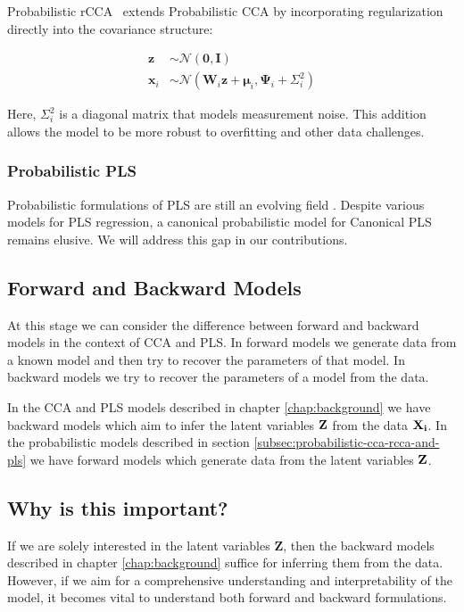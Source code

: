 Probabilistic rCCA~\cite{de2003regularization} extends Probabilistic CCA by incorporating regularization directly into the covariance structure:

\begin{align}
    \mathbf{z}& \sim \mathcal{N}(\mathbf{0}, \mathbf{I})                                            \\
    \mathbf{x}_i & \sim \mathcal{N}(\mathbf{W}_i \mathbf{z} + \boldsymbol{\mu}_i, \boldsymbol{\Psi}_i + \Sigma_i^2)
\end{align}

Here, \(\Sigma_i^2\) is a diagonal matrix that models measurement noise. This addition allows the model to be more robust to overfitting and other data challenges.

\subsubsection{Probabilistic PLS}

Probabilistic formulations of PLS are still an evolving field \cite{el2018probabilistic,zheng2016probabilistic}.
Despite various models for PLS regression, a canonical probabilistic model for Canonical PLS remains elusive.
We will address this gap in our contributions.

\subsection{Forward and Backward Models}

At this stage we can consider the difference between forward and backward models in the context of CCA and PLS.
In forward models we generate data from a known model and then try to recover the parameters of that model.
In backward models we try to recover the parameters of a model from the data.

In the CCA and PLS models described in chapter \ref{chap:background} we have backward models which aim to infer the
latent variables $\bold{Z}$ from the data $\bold{X_i}$.
In the probabilistic models described in section \ref{subsec:probabilistic-cca-rcca-and-pls} we have forward models which
generate data from the latent variables $\bold{Z}$.

\subsection{Why is this important?}

If we are solely interested in the latent variables $\boldsymbol{Z}$, then the backward models described in chapter \ref{chap:background} suffice for inferring them from the data. However, if we aim for a comprehensive understanding and interpretability of the model, it becomes vital to understand both forward and backward formulations.

